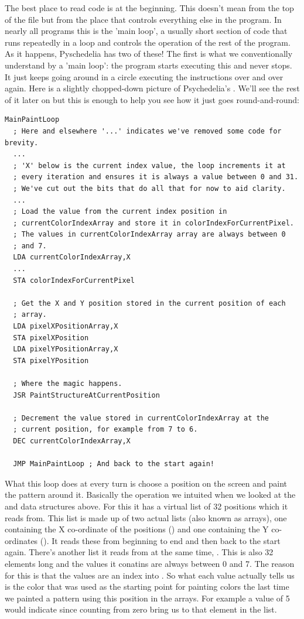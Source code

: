 The best place to read code is at the beginning. This doesn't mean from the top of the file but from the place that controls everything
else in the program. In nearly all programs this is the 'main loop', a usually short section of code that runs repeatedly in a loop and
controls the operation of the rest of the program. As it happens, Pyschedelia has two of these! The first is what we conventionally 
understand by a 'main loop': the program starts executing this and never stops. It just keeps going around in a circle executing the instructions 
over and over again. Here is a slightly chopped-down picture of Psychedelia's . We'll see the rest of it later on
but this is enough to help you see how it just goes round-and-round:

\begin{lstlisting}
MainPaintLoop   
  ; Here and elsewhere '...' indicates we've removed some code for brevity.
  ... 
  ; 'X' below is the current index value, the loop increments it at
  ; every iteration and ensures it is always a value between 0 and 31. 
  ; We've cut out the bits that do all that for now to aid clarity.
  ...
  ; Load the value from the current index position in
  ; currentColorIndexArray and store it in colorIndexForCurrentPixel.
  ; The values in currentColorIndexArray array are always between 0 
  ; and 7. 
  LDA currentColorIndexArray,X
  ...
  STA colorIndexForCurrentPixel

  ; Get the X and Y position stored in the current position of each
  ; array.
  LDA pixelXPositionArray,X
  STA pixelXPosition
  LDA pixelYPositionArray,X
  STA pixelYPosition

  ; Where the magic happens.
  JSR PaintStructureAtCurrentPosition

  ; Decrement the value stored in currentColorIndexArray at the
  ; current position, for example from 7 to 6.
  DEC currentColorIndexArray,X

  JMP MainPaintLoop ; And back to the start again!
\end{lstlisting}

What this loop does at every turn is choose a position on the screen and paint the pattern around it. Basically the operation we intuited
when we looked at the  and  data structures above. For this it has a virtual list of
32 positions which it reads from. This list is made up of two actual lists (also known as arrays), one containing the X co-ordinate
of the positions () and one containing the Y co-ordinates (). It reads these
from beginning to end and then back to the start again. There's another list it reads from at the same time, .
This is also 32 elements long and the values it conatins are always between 0 and 7. The reason for this is that the values
are an index into . So
what each value actually tells us is the color that was used as the starting point for painting colors the last time we painted a pattern
using this position in the arrays. For example a value of 5 would indicate  since counting from zero bring us to that element
in the list.

